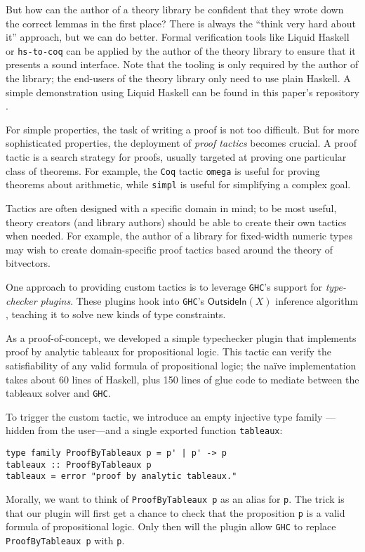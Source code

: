 \documentclass[format=sigplan, review=false, screen=true, 10pt]{acmart}
\makeatletter
\let\origsubsection\subsection
\renewcommand\subsection{\@ifstar{\starsubsection}{\nostarsubsection}}
\newcommand\nostarsubsection[1]
{\subsectionprelude\origsubsection{#1}\subsectionpostlude}
\newcommand\starsubsection[1]
{\subsectionprelude\origsubsection*{#1}\subsectionpostlude}
\newcommand\subsectionprelude{%
  \vspace{-0.25em}
}
\newcommand\subsectionpostlude{%
  \vspace{-0.05em}
}
\makeatother
\begin{document}
But how can the author of a theory library be confident that they wrote down
the correct lemmas in the first place? There is always the ``think very hard
about it'' approach, but we can do better. Formal verification tools like
Liquid Haskell \cite{vazou2016liquid} or \texttt{hs-to-coq} \cite{spector2018total}
can be applied by the author of the theory library to ensure that it presents a
sound interface. Note that the tooling is only required by the author of the library;
the end-users of the theory library only need to use plain Haskell. A simple
demonstration using Liquid Haskell can be found in this paper's repository \cite{this}.

\subsection{Building custom proof tactics}\label{tactics}

For simple properties, the task of writing a proof is not too difficult. But for
more sophisticated properties, the deployment of \emph{proof tactics} becomes
crucial. A proof tactic is a search strategy for proofs, usually targeted at
proving one particular class of theorems. For example, the \texttt{Coq} tactic
\texttt{omega} is useful for proving theorems about arithmetic, while
\texttt{simpl} is useful for simplifying a complex goal.

Tactics are often designed with a specific domain in mind; to be most useful,
theory creators (and library authors) should be able to create their own tactics
when needed. For example, the author of  a library for  fixed-width numeric types
may wish to create domain-specific proof tactics based around the theory of bitvectors.

One approach to providing custom tactics is to leverage \texttt{GHC}'s support for
\emph{type-checker plugins}. These plugins hook into \texttt{GHC}'s $\textsf{OutsideIn}(X)$
inference algorithm \cite{vytiniotis2011outsidein}, teaching it to solve
new kinds of type constraints.

As a proof-of-concept, we developed a simple typechecker plugin that implements
proof by analytic tableaux \cite{smullyan1995first} for propositional logic. This tactic
can verify the satisfiability of any
valid formula of propositional logic; the na\"ive implementation takes about
60 lines of Haskell, plus 150 lines of glue code to mediate between
the tableaux solver and \texttt{GHC}.

To trigger the custom tactic, we introduce an empty injective type family \cite{stolarek2015injective}---hidden from the user---and a single exported function \texttt{tableaux}:
\begin{verbatim}
type family ProofByTableaux p = p' | p' -> p
tableaux :: ProofByTableaux p
tableaux = error "proof by analytic tableaux."
\end{verbatim}
Morally, we want to think of \texttt{ProofByTableaux p} as an alias for \texttt{p}.
The trick is that our plugin will first get a chance to check that the proposition \texttt{p} is
a valid formula of propositional logic. Only then will the plugin allow \texttt{GHC}
to replace \texttt{ProofByTableaux p} with \texttt{p}.
\end{document}
